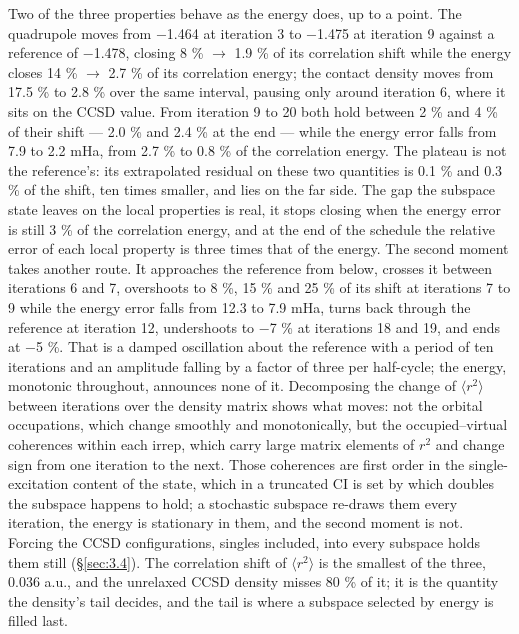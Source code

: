 \documentclass[11pt]{article}
\begin{document}
Two of the three properties behave as the energy does, up to a point. The quadrupole moves from $-$1.464 at iteration 3 to $-$1.475 at iteration 9 against a reference of $-$1.478, closing 8 \% $\to$ 1.9 \% of its correlation shift while the energy closes 14 \% $\to$ 2.7 \% of its correlation energy; the contact density moves from 17.5 \% to 2.8 \% over the same interval, pausing only around iteration 6, where it sits on the CCSD value. From iteration 9 to 20 both hold between 2 \% and 4 \% of their shift --- 2.0 \% and 2.4 \% at the end --- while the energy error falls from 7.9 to 2.2 mHa, from 2.7 \% to 0.8 \% of the correlation energy. The plateau is not the reference's: its extrapolated residual on these two quantities is 0.1 \% and 0.3 \% of the shift, ten times smaller, and lies on the far side. The gap the subspace state leaves on the local properties is real, it stops closing when the energy error is still 3 \% of the correlation energy, and at the end of the schedule the relative error of each local property is three times that of the energy. The second moment takes another route. It approaches the reference from below, crosses it between iterations 6 and 7, overshoots to 8 \%, 15 \% and 25 \% of its shift at iterations 7 to 9 while the energy error falls from 12.3 to 7.9 mHa, turns back through the reference at iteration 12, undershoots to $-$7 \% at iterations 18 and 19, and ends at $-$5 \%. That is a damped oscillation about the reference with a period of ten iterations and an amplitude falling by a factor of three per half-cycle; the energy, monotonic throughout, announces none of it. Decomposing the change of $\langle r^{2}\rangle$ between iterations over the density matrix shows what moves: not the orbital occupations, which change smoothly and monotonically, but the occupied--virtual coherences within each irrep, which carry large matrix elements of $r^{2}$ and change sign from one iteration to the next. Those coherences are first order in the single-excitation content of the state, which in a truncated CI is set by which doubles the subspace happens to hold; a stochastic subspace re-draws them every iteration, the energy is stationary in them, and the second moment is not. Forcing the CCSD configurations, singles included, into every subspace holds them still (\S\ref{sec:3.4}). The correlation shift of $\langle r^{2}\rangle$ is the smallest of the three, 0.036 a.u., and the unrelaxed CCSD density misses 80 \% of it; it is the quantity the density's tail decides, and the tail is where a subspace selected by energy is filled last.
\end{document}
